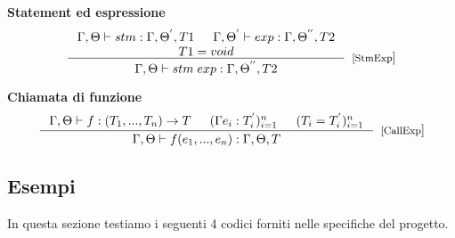 \textbf{Statement ed espressione}
\[
\inference{\Gamma, \Theta \vdash stm:\Gamma, \Theta^{'}, T1 & \Gamma, \Theta^{'} \vdash exp:\Gamma, \Theta^{''}, T2 \\ T1 = void}{\Gamma, \Theta \vdash stm \; exp: \Gamma, \Theta^{''}, T2}[[StmExp]]
\]

\textbf{Chiamata di funzione} 
\[
\inference{\Gamma, \Theta \vdash f: (T_{1}, ..., T_{n}) \rightarrow T & (\Gamma e_{i}: T^{'}_{i})^{n}_{i = 1} & (T_{i} = T^{'}_{i})^{n}_{i = 1}}{\Gamma, \Theta \vdash f(e_{1},...,e_{n}): \Gamma, \Theta, T}[[CallExp]]
\]


\subsection{Esempi}
In questa sezione testiamo i seguenti 4 codici forniti nelle specifiche del progetto.
